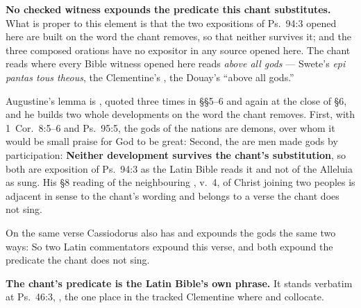 \textbf{No checked witness expounds the predicate this chant substitutes.} What
is proper to this element is that the two expositions of Ps.~94:3 opened here are
built on the word the chant removes, so that neither survives it; and the three
composed orations have no expositor in any source opened here. The chant reads
 where every Bible witness opened here
reads \emph{above all gods} ---
Swete's \emph{epi pantas tous theous}, the Clementine's ,
the Douay's ``above all gods.''

\begin{witnessnote}
Augustine's lemma is , quoted three times in
§§5--6 and again at the close of §6, and he builds two whole developments on the
word the chant removes. First, with 1~Cor.\ 8:5--6 and Ps.\ 95:5, the gods of the
nations are demons, over whom it would be small praise for God to be great:
 Second, the  are men made gods by
participation:  \textbf{Neither development survives the chant's substitution}, so both are
exposition of Ps.\ 94:3 as the Latin Bible reads it and not of the Alleluia as
sung. His §8 reading of the neighbouring , v.~4,
of Christ joining two peoples is adjacent in sense to the chant's wording and belongs
to a verse the chant does not sing.
\end{witnessnote}

\begin{witnessnote}
 On the
same verse Cassiodorus also has  and
expounds the gods the same two ways:  So two Latin
commentators expound this verse, and both expound the predicate the chant does
not sing.
\end{witnessnote}

\textbf{The chant's predicate is the Latin Bible's own phrase.} It stands
verbatim at Ps.\ 46:3, , the one place in the tracked Clementine where  and  collocate.

